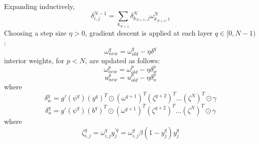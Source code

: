 \documentclass{article}
\begin{document}
Expanding inductively,
%
\begin{equation} \label{eq:delta2}
\delta_{i,j}^{N-1} =
\sum_{k_{N+1}} \delta_{k_{N+1},j}^N \omega_{k_{N+1},i}^N
\end{equation}
%
Choosing a step size $\eta > 0$, gradient descent is applied at each layer $q \in [0, N-1)$:
%
\begin{equation} \label{eq:end_weights}
\omega_{new}^q = \omega_{old}^q - \eta \delta^q
\end{equation}
%
interior weights, for $p < N$, are updated as follows:
%
\begin{equation} \label{eq:w_weights}
\omega_{new}^p = \omega_{old}^p - \eta \delta_w^p
\end{equation}
%
\begin{equation} \label{eq:u_weights}
u_{new}^p = u_{old}^p - \eta \delta_u^p
\end{equation}
%
where
%
\begin{equation} \label{eq:w_delta}
\delta_w^{q} = g'(\psi^{q}) (y^{q})^T \odot (\omega^{q+1})^T (\zeta^{q+2})^T ... (\zeta^N)^T \odot \gamma
\end{equation}
%
\begin{equation} \label{eq:u_delta}
\delta_u^{q} = g'(\psi^{q}) (b^{q})^T \odot (\omega^{q+1})^T (\zeta^{q+2})^T ... (\zeta^N)^T \odot \gamma
\end{equation}
%
where
%
\begin{equation} \label{eq:u_delta}
\zeta_{i,j}^q = \omega_{i,j}^q y_j^{\prime q} = \omega_{i,j}^q \beta (1 - y_j^q) y_j^q
\end{equation}
%
\end{document}
